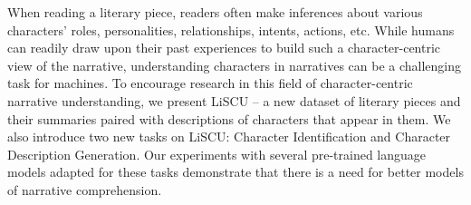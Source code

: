 When reading a literary piece, readers often make inferences about various characters' roles, personalities, relationships, intents, actions, etc. While humans can readily draw upon their past experiences to build such a character-centric view of the narrative, understanding characters in narratives can be a challenging task for machines. To encourage research in this field of character-centric narrative understanding, we present LiSCU -- a new dataset of literary pieces and their summaries paired with descriptions of characters that appear in them. We also introduce two new tasks on LiSCU: Character Identification and Character Description Generation. Our experiments with several pre-trained language models adapted for these tasks demonstrate that there is a need for better models of narrative comprehension.
